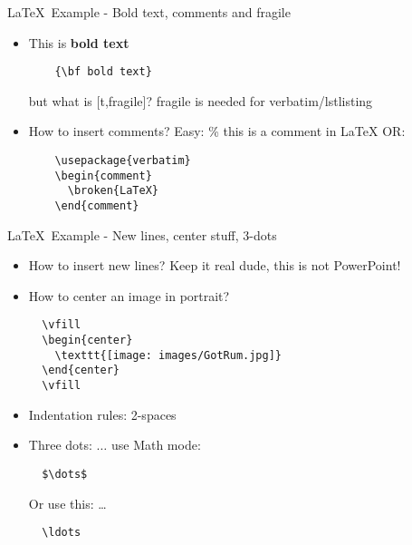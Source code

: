 
\begin{frame}[t,plain]
  \titlepage
\end{frame}

\begin{frame}[t,fragile]{\LaTeX\ Example - Bold text, comments and fragile}
\begin{itemize}
  \item This is {\bf bold text}
  \begin{lstlisting}
    {\bf bold text}
  \end{lstlisting}
but what is [t,fragile]?
fragile is needed for verbatim/lstlisting
  \item How to insert comments?
  Easy: \% this is a comment in LaTeX
  OR:
  \begin{lstlisting}
    \usepackage{verbatim}
    \begin{comment}
      \broken{LaTeX}
    \end{comment}
  \end{lstlisting}
  \end{itemize}
\end{frame}

\begin{frame}[t,fragile]{\LaTeX\ Example - New lines, center stuff, 3-dots}
\begin{itemize}
  \item How to insert new lines?
  Keep it real dude, this is not PowerPoint!
  \item How to center an image in portrait?
  \begin{lstlisting}
  \vfill
  \begin{center}
    \texttt{[image: images/GotRum.jpg]}
  \end{center}
  \vfill
  \end{lstlisting}
  \item Indentation rules: 2-spaces
  \item Three dots: $\dots$
  use Math mode:
  \begin{lstlisting}
  $\dots$
  \end{lstlisting}
  Or use this: \ldots
  \begin{lstlisting}
  \ldots
  \end{lstlisting}
\end{itemize}
\end{frame}

